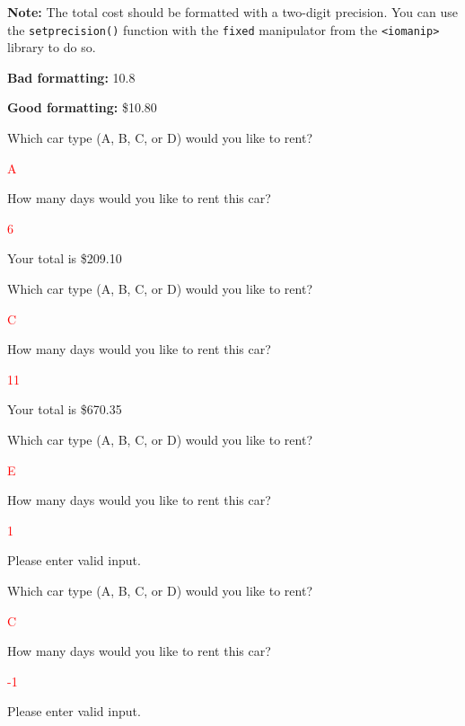 \hspace{1pt}

\textbf{Note:} The total cost should be formatted with a two-digit precision. You can use the \texttt{setprecision()} function with the \texttt{fixed} manipulator from the \texttt{<iomanip>} library to do so. 

\textbf{Bad formatting:} 10.8

\textbf{Good formatting:} \$10.80

\begin{sample}
Which car type (A, B, C, or D) would you like to rent?

\textcolor{red}{A}

How many days would you like to rent this car?

\textcolor{red}{6}

Your total is \$209.10
\end{sample}

\begin{sample}
Which car type (A, B, C, or D) would you like to rent?

\textcolor{red}{C}

How many days would you like to rent this car?

\textcolor{red}{11}

Your total is \$670.35
\end{sample}

\begin{sample}
Which car type (A, B, C, or D) would you like to rent?

\textcolor{red}{E}

How many days would you like to rent this car?

\textcolor{red}{1}

Please enter valid input.
\end{sample}

\begin{sample}
Which car type (A, B, C, or D) would you like to rent?

\textcolor{red}{C}

How many days would you like to rent this car?

\textcolor{red}{-1}

Please enter valid input.
\end{sample}


